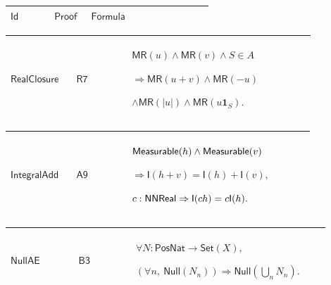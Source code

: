 \documentclass[12pt,reqno]{amsart}
\theoremstyle{blueplain}
\numberwithin{equation}{section}
\begin{document}
{\scriptsize \setlength{\parskip}{0pt}\nointerlineskip
\noindent 
\begin{tabular}{|@{}>{\centering\arraybackslash}m{0.19251\linewidth}|>{\centering\arraybackslash}m{0.16845\linewidth}|>{\centering\arraybackslash}m{0.53904\linewidth}|}
\hline
$\displaystyle \mathsf{Id}$ & $\displaystyle \mathsf{Proof}$ & $%
\displaystyle \mathsf{Formula}$ \\ \hline
\end{tabular}%
}

{\scriptsize \setlength{\parskip}{0pt}\nointerlineskip
\noindent 
\begin{tabular}{|@{}>{\centering\arraybackslash}m{0.19251\linewidth}|>{\centering\arraybackslash}m{0.16845\linewidth}|>{\centering\arraybackslash}m{0.53904\linewidth}|}
\hline
\hypertarget{dctlem:RealClosure}{$\displaystyle \mathsf{RealClosure}$} & 
\hyperlink{dct:R7}{$\displaystyle \mathsf{R7}$} & $\displaystyle \mathsf{MR}%
(u)\land\mathsf{MR}(v)\land S\in A$\par$\displaystyle \Rightarrow\mathsf{MR}%
(u+v)\land\mathsf{MR}(-u)$\par$\displaystyle \land\mathsf{MR}(|u|)\land%
\mathsf{MR}(u\mathbf{1}_S).$ \\ \hline
\end{tabular}%
}

{\scriptsize \setlength{\parskip}{0pt}\nointerlineskip
\noindent 
\begin{tabular}{|@{}>{\centering\arraybackslash}m{0.19251\linewidth}|>{\centering\arraybackslash}m{0.16845\linewidth}|>{\centering\arraybackslash}m{0.53904\linewidth}|}
\hline
\hypertarget{dctlem:IntegralAdd}{$\displaystyle \mathsf{IntegralAdd}$} & 
\hyperlink{dct:A9}{$\displaystyle \mathsf{A9}$} & $\displaystyle \mathsf{%
Measurable}(h)\land\mathsf{Measurable}(v)$\par$\displaystyle \Rightarrow%
\mathsf{I}(h+v)=\mathsf{I}(h)+\mathsf{I}(v),$\par$\displaystyle c:\mathsf{%
NNReal}\Rightarrow\mathsf{I}(ch)=c\mathsf{I}(h).$ \\ \hline
\end{tabular}%
}

{\scriptsize \setlength{\parskip}{0pt}\nointerlineskip
\noindent 
\begin{tabular}{|@{}>{\centering\arraybackslash}m{0.19251\linewidth}|>{\centering\arraybackslash}m{0.16845\linewidth}|>{\centering\arraybackslash}m{0.53904\linewidth}|}
\hline
\hypertarget{dctlem:NullAE}{$\displaystyle \mathsf{NullAE}$} & \hyperlink{dct:B3}%
{$\displaystyle \mathsf{B3}$} & $\displaystyle \forall N:\mathsf{PosNat}\to%
\mathsf{Set}(X),$\par$\displaystyle (\forall n,\ \mathsf{Null}%
(N_n))\Rightarrow\mathsf{Null}(\bigcup_n N_n).$ \\ \hline
\end{tabular}%
}
\end{document}

